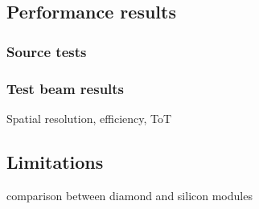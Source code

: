 \documentclass[12pt]{packages/mytustyle}  %
\begin{document}
\subsection{Performance results}
\subsubsection{Source tests}
\subsubsection{Test beam results}
Spatial resolution, efficiency, ToT
\subsection{Limitations}
comparison between diamond and silicon modules






\end{document}
